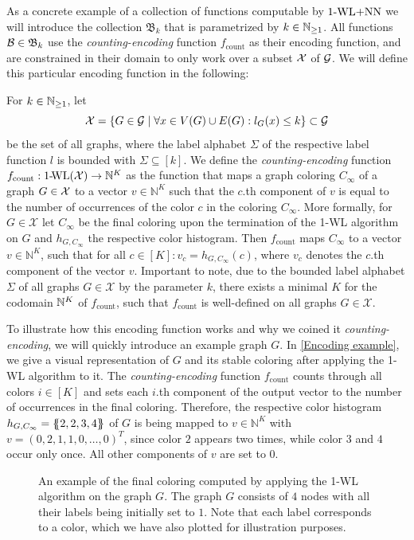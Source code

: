 As a concrete example of a collection of functions computable by $\text{1-WL+NN}$ we will introduce the collection $\mathfrak{B}_k$ that is parametrized by $k \in \mathbb{N}_{\geq 1}$. All functions $\mathcal{B} \in \mathfrak{B}_k$ use the \emph{counting-encoding} function $f_{\text{count}}$ as their encoding function, and are constrained in their domain to only work over a subset $\mathcal{X}$ of $\mathcal{G}$. We will define this particular encoding function in the following:

\begin{definition}\label{def:counting_encoding}
    For $k \in \mathbb{N}_{\geq 1}$, let 
    \begin{equation*}
        \mathcal{X} = \{ G \in \mathcal{G} \mid \forall x \in V(G) \cup E(G): l_G(x) \leq k \} \subset \mathcal{G}
    \end{equation*}
        be the set of all graphs, where the label alphabet $\Sigma$ of the respective label function $l$ is bounded with $\Sigma \subseteq [k]$. We define the \emph{counting-encoding} function $f_{\text{count}}: \text{1-\!WL}(\mathcal{X}) \rightarrow \mathbb{N}^K$ as the function that maps a graph coloring $C_\infty$ of a graph $G \in \mathcal{X}$ to a vector $v \in \mathbb{N}^K$ such that the $c$.th component of $v$ is equal to the number of occurrences of the color $c$ in the coloring $C_\infty$. More formally, for $G \in \mathcal{X}$ let $C_\infty$ be the final coloring upon the termination of the 1-WL algorithm on $G$ and $h_{G, C_\infty}$ the respective color histogram. Then $f_{\text{count}}$ maps $C_\infty$ to a vector $v \in \mathbb{N}^K$, such that for all $c \in [K]: v_c = h_{G, C_\infty}(c)$, where $v_c$ denotes the $c$.th component of the vector $v$. Important to note, due to the bounded label alphabet $\Sigma$ of all graphs $G 
    \in \mathcal{X}$ by the parameter $k$, there exists a minimal $K$ for the codomain $\mathbb{N}^K$ of $f_{\text{count}}$, such that $f_{\text{count}}$ is well-defined on all graphs $G \in \mathcal{X}$.
\end{definition}

To illustrate how this encoding function works and why we coined it \emph{counting-encoding}, we will quickly introduce an example graph $G$. In \autoref{Encoding example}, we give a visual representation of $G$ and its stable coloring after applying the 1-WL algorithm to it. The \emph{counting-encoding} function $f_{\text{count}}$ counts through all colors $i \in [K]$ and sets each $i$.th component of the output vector to the number of occurrences in the final coloring. Therefore, the respective color histogram $h_{G, C_\infty} = \{\!\!\{ 2, 2, 3, 4 \}\!\!\}$ of $G$ is being mapped to $v \in \mathbb{N}^K$ with $v = (0, 2, 1, 1,0,  \dots ,0)^T$, since color $2$ appears two times, while color $3$ and $4$ occur only once. All other components of $v$ are set to $0$.
\begin{figure}[H]
    \centering
    
    \caption{An example of the final coloring computed by applying the 1-WL algorithm on the graph $G$. The graph $G$ consists of $4$ nodes with all their labels being initially set to $1$. Note that each label corresponds to a color, which we have also plotted for illustration purposes.}
    \label{Encoding example}
\end{figure}

